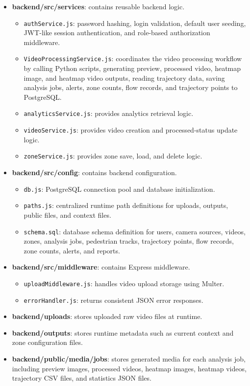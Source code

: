 \documentclass[12pt,a4paper]{report}
\begin{document}
\begin{itemize}
    \item \textbf{backend/src/services}: contains reusable backend logic.
    \begin{itemize}
        \item \texttt{authService.js}: password hashing, login validation, default user seeding, JWT-like session authentication, and role-based authorization middleware.
        \item \texttt{VideoProcessingService.js}: coordinates the video processing workflow by calling Python scripts, generating preview, processed video, heatmap image, and heatmap video outputs, reading trajectory data, saving analysis jobs, alerts, zone counts, flow records, and trajectory points to PostgreSQL.
        \item \texttt{analyticsService.js}: provides analytics retrieval logic.
        \item \texttt{videoService.js}: provides video creation and processed-status update logic.
        \item \texttt{zoneService.js}: provides zone save, load, and delete logic.
    \end{itemize}
    
    \item \textbf{backend/src/config}: contains backend configuration.
    \begin{itemize}
        \item \texttt{db.js}: PostgreSQL connection pool and database initialization.
        \item \texttt{paths.js}: centralized runtime path definitions for uploads, outputs, public files, and context files.
        \item \texttt{schema.sql}: database schema definition for users, camera sources, videos, zones, analysis jobs, pedestrian tracks, trajectory points, flow records, zone counts, alerts, and reports.
    \end{itemize}
    
    \item \textbf{backend/src/middleware}: contains Express middleware.
    \begin{itemize}
        \item \texttt{uploadMiddleware.js}: handles video upload storage using Multer.
        \item \texttt{errorHandler.js}: returns consistent JSON error responses.
    \end{itemize}
    
    \item \textbf{backend/uploads}: stores uploaded raw video files at runtime.
    
    \item \textbf{backend/outputs}: stores runtime metadata such as current context and zone configuration files.
    
    \item \textbf{backend/public/media/jobs}: stores generated media for each analysis job, including preview images, processed videos, heatmap images, heatmap videos, trajectory CSV files, and statistics JSON files.
\end{itemize}
\end{document}
